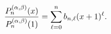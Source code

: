 \[\frac{\mathop{P^{(\alpha,\beta)}_{n}\/}\nolimits\!\left(x\right)}{\mathop{P^{(%
\alpha,\beta)}_{n}\/}\nolimits\!\left(1\right)}=\sum_{\ell=0}^{n}b_{n,\ell}(x+%
1)^{\ell}.\]